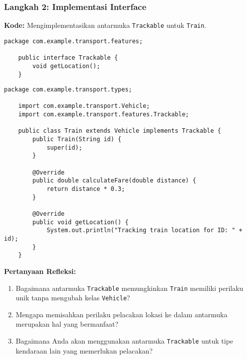 \subsubsection{Langkah 2: Implementasi Interface}

\textbf{Kode:} Mengimplementasikan antarmuka \texttt{Trackable} untuk \texttt{Train}.

\begin{lstlisting}[style=JavaStyle, caption={Trackable.java}]
	package com.example.transport.features;
	
	public interface Trackable {
		void getLocation();
	}
\end{lstlisting}

\begin{lstlisting}[style=JavaStyle, caption={Train.java}]
	package com.example.transport.types;
	
	import com.example.transport.Vehicle;
	import com.example.transport.features.Trackable;
	
	public class Train extends Vehicle implements Trackable {
		public Train(String id) {
			super(id);
		}
		
		@Override
		public double calculateFare(double distance) {
			return distance * 0.3;
		}
		
		@Override
		public void getLocation() {
			System.out.println("Tracking train location for ID: " + id);
		}
	}
\end{lstlisting}

\textbf{Pertanyaan Refleksi:}
\begin{enumerate}
	\item Bagaimana antarmuka \texttt{Trackable} memungkinkan \texttt{Train} memiliki perilaku unik tanpa mengubah kelas \texttt{Vehicle}?
	\begin{tcolorbox}[colback=white, colframe=black,  width=\linewidth, height=3cm, boxrule=1pt, sharp corners]
	\end{tcolorbox}
	\item Mengapa memisahkan perilaku pelacakan lokasi ke dalam antarmuka merupakan hal yang bermanfaat?
	\begin{tcolorbox}[colback=white, colframe=black,  width=\linewidth, height=3cm, boxrule=1pt, sharp corners]
	\end{tcolorbox}
	\item Bagaimana Anda akan menggunakan antarmuka \texttt{Trackable} untuk tipe kendaraan lain yang memerlukan pelacakan?
	\begin{tcolorbox}[colback=white, colframe=black,  width=\linewidth, height=3cm, boxrule=1pt, sharp corners]
	\end{tcolorbox}
\end{enumerate}

